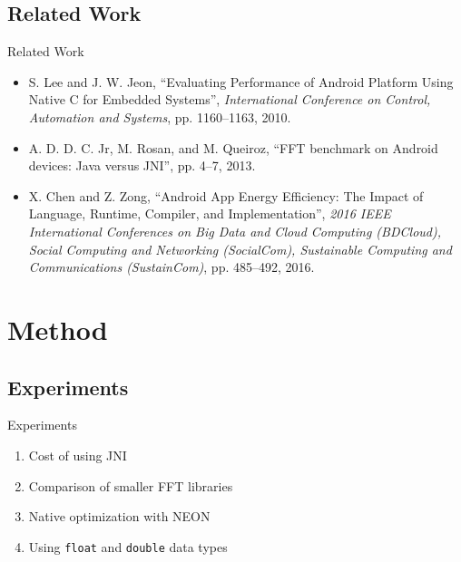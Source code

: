 \documentclass[xcolor={table}]{beamer}
\begin{document}
\subsection{Related Work}
\begin{frame}{Related Work}
    \begin{itemize}
        \item<1-> S. Lee and J. W. Jeon, \enquote{Evaluating Performance of Android Platform Using Native C for Embedded Systems}, \emph{International Conference on Control, Automation and Systems}, pp. 1160–1163, 2010.
        \item<2-> A. D. D. C. Jr, M. Rosan, and M. Queiroz, \enquote{FFT benchmark on Android devices: Java versus JNI}, pp. 4–7, 2013.
        \item<3-> X. Chen and Z. Zong, \enquote{Android App Energy Efficiency: The Impact of Language, Runtime, Compiler, and Implementation}, \emph{2016 IEEE International Conferences on Big Data and Cloud Computing (BDCloud), Social Computing and Networking (SocialCom), Sustainable Computing and Communications (SustainCom)}, pp. 485–492, 2016.
    \end{itemize}
\end{frame}

\section{Method}

\subsection{Experiments}
\begin{frame}{Experiments}
    \begin{enumerate}
        \item Cost of using JNI
        \item Comparison of smaller FFT libraries
        \item Native optimization with NEON
        \item Using \texttt{float} and \texttt{double} data types
    \end{enumerate}
\end{frame}
\end{document}

